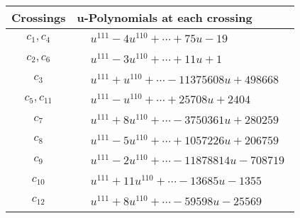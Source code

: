 \documentclass[1p]{elsarticle_modified}
\theoremstyle{definition}
\begin{document}
\begin{tabular}{m{50pt}|m{274pt}}
Crossings & \hspace{64pt}u-Polynomials at each crossing \\
\hline $$\begin{aligned}c_{1},c_{4}\end{aligned}$$&$\begin{aligned}
&u^{111}-4 u^{110}+\cdots+75 u-19
\end{aligned}$\\
\hline $$\begin{aligned}c_{2},c_{6}\end{aligned}$$&$\begin{aligned}
&u^{111}-3 u^{110}+\cdots+11 u+1
\end{aligned}$\\
\hline $$\begin{aligned}c_{3}\end{aligned}$$&$\begin{aligned}
&u^{111}+u^{110}+\cdots-11375608 u+498668
\end{aligned}$\\
\hline $$\begin{aligned}c_{5},c_{11}\end{aligned}$$&$\begin{aligned}
&u^{111}- u^{110}+\cdots+25708 u+2404
\end{aligned}$\\
\hline $$\begin{aligned}c_{7}\end{aligned}$$&$\begin{aligned}
&u^{111}+8 u^{110}+\cdots-3750361 u+280259
\end{aligned}$\\
\hline $$\begin{aligned}c_{8}\end{aligned}$$&$\begin{aligned}
&u^{111}-5 u^{110}+\cdots+1057226 u+206759
\end{aligned}$\\
\hline $$\begin{aligned}c_{9}\end{aligned}$$&$\begin{aligned}
&u^{111}-2 u^{110}+\cdots-11878814 u-708719
\end{aligned}$\\
\hline $$\begin{aligned}c_{10}\end{aligned}$$&$\begin{aligned}
&u^{111}+11 u^{110}+\cdots-13685 u-1355
\end{aligned}$\\
\hline $$\begin{aligned}c_{12}\end{aligned}$$&$\begin{aligned}
&u^{111}+8 u^{110}+\cdots-59598 u-25569
\end{aligned}$\\
\hline
\end{tabular}\\~\\
\end{document}
